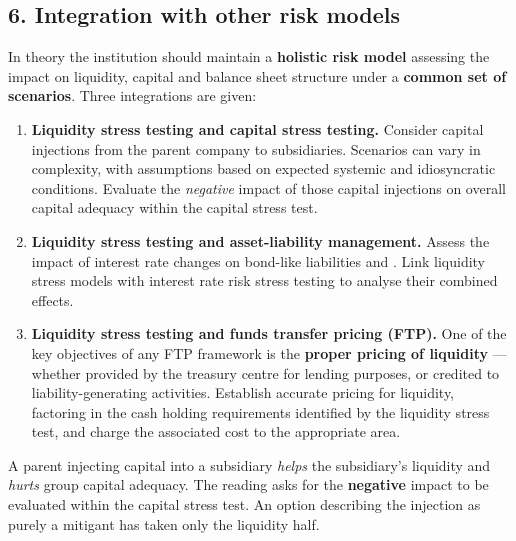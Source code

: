 \subsection{6. Integration with other risk models}

In theory the institution should maintain a \textbf{holistic risk model} assessing the impact on liquidity, capital and balance sheet structure under a \textbf{common set of scenarios}. Three integrations are given:

\begin{enumerate}
\item \textbf{Liquidity stress testing and capital stress testing.} Consider capital injections from the parent company to subsidiaries. Scenarios can vary in complexity, with assumptions based on expected systemic and idiosyncratic conditions. Evaluate the \emph{negative} impact of those capital injections on overall capital adequacy within the capital stress test.
\item \textbf{Liquidity stress testing and asset-liability management.} Assess the impact of interest rate changes on bond-like liabilities and . Link liquidity stress models with interest rate risk stress testing to analyse their combined effects.
\item \textbf{Liquidity stress testing and funds transfer pricing (FTP).} One of the key objectives of any FTP framework is the \textbf{proper pricing of liquidity} --- whether provided by the treasury centre for lending purposes, or credited to liability-generating activities. Establish accurate pricing for liquidity, factoring in the cash holding requirements identified by the liquidity stress test, and charge the associated cost to the appropriate area.
\end{enumerate}

\begin{lrtrapbox}
A parent injecting capital into a subsidiary \emph{helps} the subsidiary's liquidity and \emph{hurts} group capital adequacy. The reading asks for the \textbf{negative} impact to be evaluated within the capital stress test. An option describing the injection as purely a mitigant has taken only the liquidity half.
\end{lrtrapbox}

